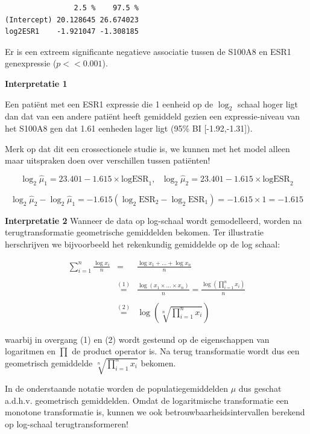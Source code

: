 \documentclass[
  dutch,
  letterpaper,
  12pt]{book}
\theoremstyle{definition}
\theoremstyle{definition}
\theoremstyle{definition}
\theoremstyle{remark}
\begin{document}
\begin{verbatim}
                2.5 %    97.5 %
(Intercept) 20.128645 26.674023
log2ESR1    -1.921047 -1.308185
\end{verbatim}

Er is een extreem significante negatieve associatie tussen de S100A8 en
ESR1 genexpressie (\(p<<0.001\)).

\textbf{Interpretatie 1}

Een patiënt met een ESR1 expressie die 1 eenheid op de \(\log_2\) schaal
hoger ligt dan dat van een andere patiënt heeft gemiddeld gezien een
expressie-niveau van het S100A8 gen dat 1.61 eenheden lager ligt (95\%
BI {[}-1.92,-1.31{]}).

Merk op dat dit een crossectionele studie is, we kunnen met het model
alleen maar uitspraken doen over verschillen tussen patiënten!

\[\log_2 \hat\mu_1=23.401  -1.615 \times \text{logESR}_1,\text{ } \log_2 \hat\mu_2=23.401  -1.615 \times \text{logESR}_2 \]

\[\log_2 \hat\mu_2-\log_2 \hat\mu_1=  -1.615 (\log_2 \text{ESR}_2-\log_2 \text{ESR}_1) = -1.615 \times 1 = -1.615\]

\textbf{Interpretatie 2} Wanneer de data op log-schaal wordt
gemodelleerd, worden na terugtransformatie geometrische gemiddelden
bekomen. Ter illustratie herschrijven we bijvoorbeeld het rekenkundig
gemiddelde op de log schaal:

\begin{eqnarray*}
\sum\limits_{i=1}^n \frac{\log x_i}{n}&=&\frac{\log x_1 + \ldots + \log x_n}{n}\\\\
&\stackrel{(1)}{=}&\frac{\log(x_1 \times \ldots \times x_n)}{n}=\frac{\log\left(\prod\limits_{i=1}^n x_i\right)}{n}\\\\
&\stackrel{(2)}{=}&\log \left(\sqrt[n]{\prod\limits_{i=1}^n x_i}\right)
\end{eqnarray*}

waarbij in overgang (1) en (2) wordt gesteund op de eigenschappen van
logaritmen en \(\prod\) de product operator is. Na terug transformatie
wordt dus een geometrisch gemiddelde
\(\sqrt[n]{\prod\limits_{i=1}^n x_i}\) bekomen.

In de onderstaande notatie worden de populatiegemiddelden \(\mu\) dus
geschat a.d.h.v. geometrisch gemiddelden. Omdat de logaritmische
transformatie een monotone transformatie is, kunnen we ook
betrouwbaarheidsintervallen berekend op log-schaal terugtransformeren!
\end{document}

